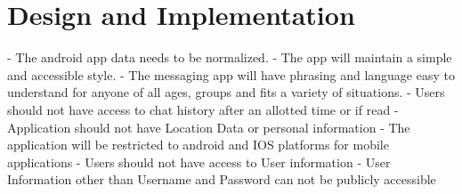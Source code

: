 \documentclass[11pt]{article}
\theoremstyle{plain}
\theoremstyle{definition}
\begin{document}
\section{Design and Implementation}\label{sec:designandimplementationrequirements}
- The android app data needs to be normalized. \newline
- The app will maintain a simple and accessible style. \newline
- The messaging app will have phrasing and language easy to understand for anyone of all 
  ages, groups and fits a variety of situations. \newline
- Users should not have access to chat history after an allotted time or if read \newline
- Application should not have Location Data or personal information \newline
- The application will be restricted to android and IOS platforms for mobile applications \newline
- Users should not have access to User information \newline
- User Information other than Username and Password can not be publicly accessible \newline
\end{document}
